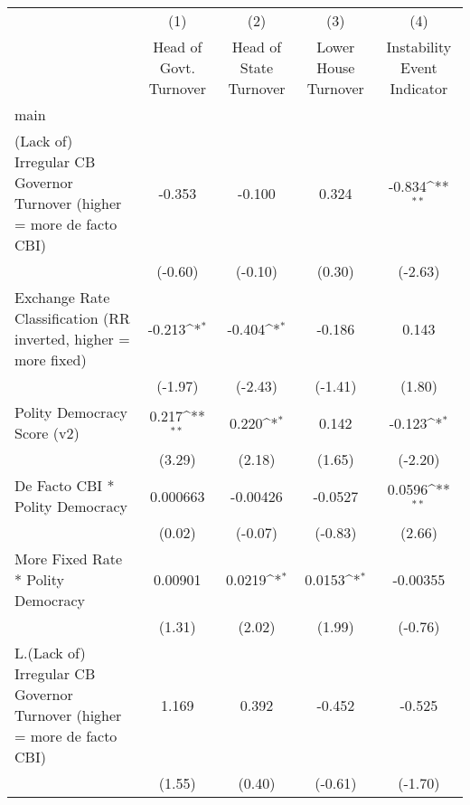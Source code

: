 {
\def\sym#1{\ifmmode^{#1}\else\(^{#1}\)\fi}
\begin{longtable}{l*{4}{c}}
\toprule\endfirsthead\midrule\endhead\midrule\endfoot\endlastfoot
                &\multicolumn{1}{c}{(1)}&\multicolumn{1}{c}{(2)}&\multicolumn{1}{c}{(3)}&\multicolumn{1}{c}{(4)}\\
                &\multicolumn{1}{c}{Head of Govt. Turnover}&\multicolumn{1}{c}{Head of State Turnover}&\multicolumn{1}{c}{Lower House Turnover}&\multicolumn{1}{c}{Instability Event Indicator}\\
\midrule
main            &                  &                  &                  &                  \\
(Lack of) Irregular CB Governor Turnover (higher = more de facto CBI)&   -0.353         &   -0.100         &    0.324         &   -0.834\sym{**} \\
                &  (-0.60)         &  (-0.10)         &   (0.30)         &  (-2.63)         \\
\addlinespace
Exchange Rate Classification (RR inverted, higher = more fixed)&   -0.213\sym{*}  &   -0.404\sym{*}  &   -0.186         &    0.143         \\
                &  (-1.97)         &  (-2.43)         &  (-1.41)         &   (1.80)         \\
\addlinespace
Polity Democracy Score (v2)&    0.217\sym{**} &    0.220\sym{*}  &    0.142         &   -0.123\sym{*}  \\
                &   (3.29)         &   (2.18)         &   (1.65)         &  (-2.20)         \\
\addlinespace
De Facto CBI * Polity Democracy& 0.000663         & -0.00426         &  -0.0527         &   0.0596\sym{**} \\
                &   (0.02)         &  (-0.07)         &  (-0.83)         &   (2.66)         \\
\addlinespace
More Fixed Rate * Polity Democracy&  0.00901         &   0.0219\sym{*}  &   0.0153\sym{*}  & -0.00355         \\
                &   (1.31)         &   (2.02)         &   (1.99)         &  (-0.76)         \\
\addlinespace
L.(Lack of) Irregular CB Governor Turnover (higher = more de facto CBI)&    1.169         &    0.392         &   -0.452         &   -0.525         \\
                &   (1.55)         &   (0.40)         &  (-0.61)         &  (-1.70)         \\

\end{longtable}}
